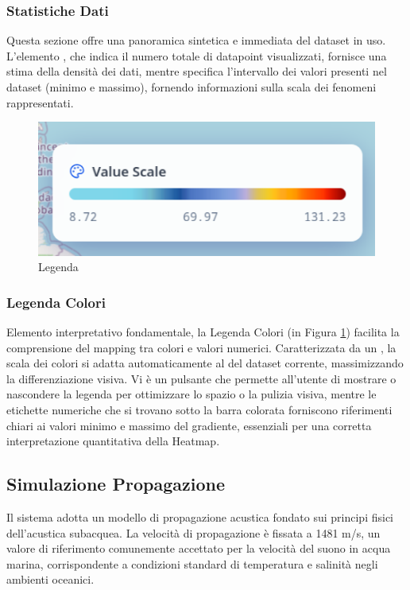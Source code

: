 \subsubsection*{Statistiche Dati}
Questa sezione offre una panoramica sintetica e immediata del dataset in uso. L'elemento , che indica il numero totale di datapoint visualizzati, fornisce una stima della densità dei dati, mentre  specifica l'intervallo dei valori presenti nel dataset (minimo e massimo), fornendo informazioni sulla scala dei fenomeni rappresentati.

\begin{figure}
    \centering
    \includegraphics[width=0.5\linewidth]{images/legenda.png}
    \caption{Legenda}
    \label{fig:legenda}
\end{figure}

\subsubsection*{Legenda Colori}
Elemento interpretativo fondamentale, la Legenda Colori (in Figura \ref{fig:legenda}) facilita la comprensione del mapping tra colori e valori numerici. Caratterizzata da un , la scala dei colori si adatta automaticamente al  del dataset corrente, massimizzando la differenziazione visiva. Vi è un pulsante che permette all'utente di mostrare o nascondere la legenda per ottimizzare lo spazio o la pulizia visiva, mentre le etichette numeriche che si trovano sotto la barra colorata forniscono riferimenti chiari ai valori minimo e massimo del gradiente, essenziali per una corretta interpretazione quantitativa della Heatmap.

\subsection{Simulazione Propagazione}

Il sistema adotta un modello di propagazione acustica fondato sui principi fisici dell'acustica subacquea. La velocità di propagazione è fissata a 1481 m/s, un valore di riferimento comunemente accettato per la velocità del suono in acqua marina, corrispondente a condizioni standard di temperatura e salinità negli ambienti oceanici.

